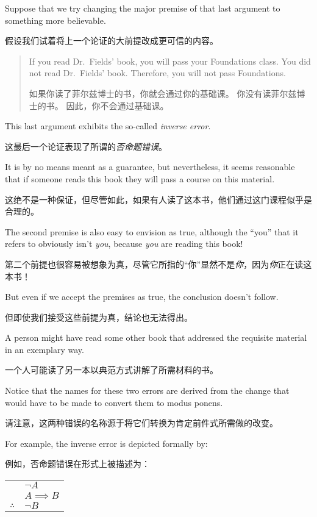 Suppose that we try changing the major premise of that last argument to
something more believable.

假设我们试着将上一个论证的大前提改成更可信的内容。
\begin{quote}
If you read Dr.\ Fields' book, you will pass your Foundations class. \newline
You did not read Dr.\ Fields' book. \newline
Therefore, you will not pass Foundations.

如果你读了菲尔兹博士的书，你就会通过你的基础课。\newline
你没有读菲尔兹博士的书。\newline
因此，你不会通过基础课。
\end{quote}

This last argument exhibits the so-called \emph{inverse error}.

这最后一个论证表现了所谓的\emph{否命题错误}。

It is by 
no means meant as a guarantee, but nevertheless, it seems reasonable that 
if someone reads this book they will pass a course on this material.

这绝不是一种保证，但尽管如此，如果有人读了这本书，他们通过这门课程似乎是合理的。

The second premise is also easy to envision as true, although the
``you'' that it refers to obviously isn't \emph{you}, because \emph{you} 
are reading this book!

第二个前提也很容易被想象为真，尽管它所指的“你”显然不是\emph{你}，因为\emph{你}正在读这本书！

But even if we accept the premises as true, the 
conclusion doesn't follow.

但即使我们接受这些前提为真，结论也无法得出。

A person might have read some other book that 
addressed the requisite material in an exemplary way.

一个人可能读了另一本以典范方式讲解了所需材料的书。

Notice that the names for these two errors are derived from the change 
that would have to be made to convert them to modus ponens.

请注意，这两种错误的名称源于将它们转换为肯定前件式所需做的改变。

For example, 
the inverse error is depicted formally by:

例如，否命题错误在形式上被描述为：

\begin{center}
\begin{tabular}{cl}
 & ${\lnot}A$ \\
 & $A \implies B$ \\ \hline
$\therefore$ & ${\lnot}B$ \\
\end{tabular}
\end{center}

